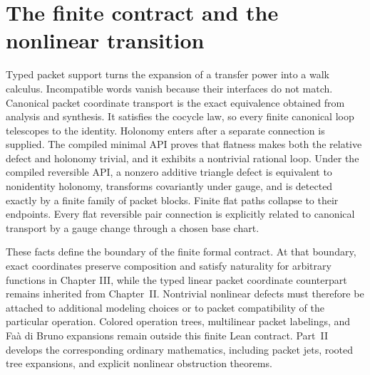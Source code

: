 \section{The finite contract and the nonlinear transition}

Typed packet support turns the expansion of a transfer power into a walk
calculus.  Incompatible words vanish because their interfaces do not match.
Canonical packet coordinate transport is the exact equivalence obtained
from analysis and synthesis.  It satisfies the cocycle law, so every finite
canonical loop telescopes to the identity.  Holonomy enters after a separate
connection is supplied.  The compiled minimal API proves that flatness makes
both the relative defect and holonomy trivial, and it exhibits a nontrivial
rational loop.  Under the compiled reversible API, a nonzero additive triangle
defect is equivalent to nonidentity holonomy, transforms covariantly under
gauge, and is detected exactly by a finite family of packet blocks.  Finite
flat paths collapse to their endpoints.  Every flat reversible pair connection
is explicitly related to canonical transport by a gauge change through a
chosen base chart.

These facts define the boundary of the finite formal contract.  At that
boundary, exact coordinates preserve composition and satisfy naturality for
arbitrary functions in Chapter III, while the typed linear packet coordinate
counterpart remains inherited from Chapter~II.  Nontrivial nonlinear defects
must therefore be attached to additional modeling choices or to
packet compatibility of the particular operation.  Colored operation trees,
multilinear packet labelings, and Fa\`a di Bruno expansions remain
outside this finite Lean contract. Part~II develops the corresponding ordinary mathematics, including packet jets, rooted tree expansions, and explicit nonlinear obstruction theorems.


\clearpage
